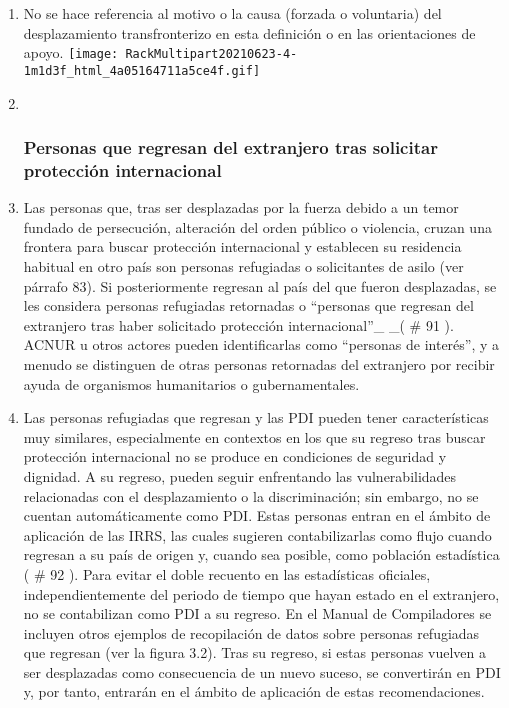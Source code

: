 \documentclass[
]{book}
\begin{document}
\begin{enumerate}
\def\labelenumi{\arabic{enumi}.}
\item
  No se hace referencia al motivo o la causa (forzada o voluntaria) del desplazamiento transfronterizo en esta definición o en las orientaciones de apoyo.
  \texttt{[image: RackMultipart20210623-4-1m1d3f\_html\_4a05164711a5ce4f.gif]}
\item ~
  \hypertarget{personas-que-regresan-del-extranjero-tras-solicitar-protecciuxf3n-internacional}{%
  \subsubsection{Personas que regresan del extranjero tras solicitar protección internacional}\label{personas-que-regresan-del-extranjero-tras-solicitar-protecciuxf3n-internacional}}
\item
  Las personas que, tras ser desplazadas por la fuerza debido a un temor fundado de persecución, alteración del orden público o violencia, cruzan una frontera para buscar protección internacional y establecen su residencia habitual en otro país son personas refugiadas o solicitantes de asilo (ver párrafo 83). Si posteriormente regresan al país del que fueron desplazadas, se les considera personas refugiadas retornadas o ``personas que regresan del extranjero tras haber solicitado protección internacional''\_ \_(
  \# 91
  ). ACNUR u otros actores pueden identificarlas como ``personas de interés'', y a menudo se distinguen de otras personas retornadas del extranjero por recibir ayuda de organismos humanitarios o gubernamentales.
\item
  Las personas refugiadas que regresan y las PDI pueden tener características muy similares, especialmente en contextos en los que su regreso tras buscar protección internacional no se produce en condiciones de seguridad y dignidad. A su regreso, pueden seguir enfrentando las vulnerabilidades relacionadas con el desplazamiento o la discriminación; sin embargo, no se cuentan automáticamente como PDI. Estas personas entran en el ámbito de aplicación de las IRRS, las cuales sugieren contabilizarlas como flujo cuando regresan a su país de origen y, cuando sea posible, como población estadística (
  \# 92
  ). Para evitar el doble recuento en las estadísticas oficiales, independientemente del periodo de tiempo que hayan estado en el extranjero, no se contabilizan como PDI a su regreso. En el Manual de Compiladores se incluyen otros ejemplos de recopilación de datos sobre personas refugiadas que regresan (ver la figura 3.2). Tras su regreso, si estas personas vuelven a ser desplazadas como consecuencia de un nuevo suceso, se convertirán en PDI y, por tanto, entrarán en el ámbito de aplicación de estas recomendaciones.

\end{enumerate}
\end{document}
